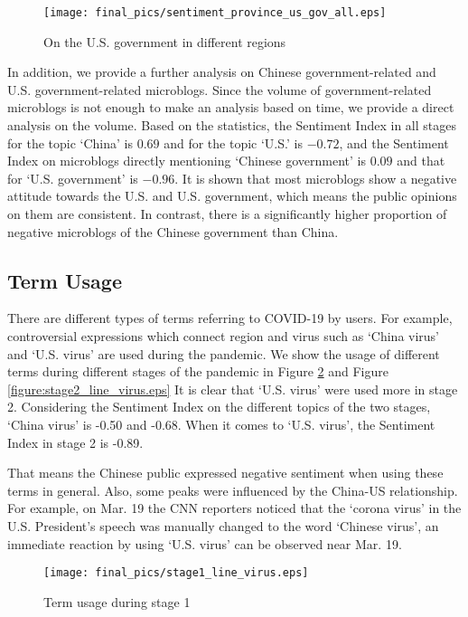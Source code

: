 \documentclass[sigconf, nonacm=true]{acmart}
\begin{document}
\begin{figure}[t]
  \texttt{[image: final\_pics/sentiment\_province\_us\_gov\_all.eps]}
  \vspace{-0.3cm}
  \caption{On the U.S. government in different regions}
  \vspace{-0.3cm}
  \label{figure:sentiment_province_us_gov_all}
\end{figure}


In addition, we provide a further analysis on Chinese government-related and U.S. government-related microblogs.
Since the volume of government-related microblogs is not enough to make an analysis based on time, we provide a direct analysis on the volume.
Based on the statistics, the Sentiment Index in all stages for the topic `China' is $0.69$ and for the topic `U.S.' is $-0.72$, and the Sentiment Index on microblogs directly mentioning `Chinese government' is $0.09$ and that for `U.S. government' is $-0.96$.
It is shown that most microblogs show a negative attitude towards the U.S. and U.S. government, which means the public opinions on them are consistent.
In contrast, there is a significantly higher proportion of negative microblogs of the  Chinese government than China.
 \vspace{-0.1cm}
\subsection{Term Usage}
There are different types of terms referring to COVID-19 by users.
For example, controversial expressions which connect region and virus such as `China virus' and `U.S. virus' are used during the pandemic.
We show the usage of different terms during different stages of the pandemic in Figure \ref{figure:stage1_line_virus.eps} and Figure \ref{figure:stage2_line_virus.eps}
It is clear that `U.S. virus' were  used more in stage 2.
Considering the Sentiment Index on the different topics of the two stages, `China virus' is -0.50 and -0.68.
When it comes to `U.S. virus', the Sentiment Index in stage 2 is -0.89.

That means the Chinese public expressed negative sentiment when using these terms in general.
Also, some peaks were influenced by the China-US relationship.
For example, on Mar. 19 the CNN reporters noticed that the `corona virus' in the U.S. President's speech was manually changed to the word `Chinese virus', an immediate reaction by using `U.S. virus' can be observed near Mar. 19.
\begin{figure}[t!]
  \texttt{[image: final\_pics/stage1\_line\_virus.eps]}
  \vspace{-0.3cm}
  \caption{Term usage during stage 1}
  \vspace{-0.3cm}
  \label{figure:stage1_line_virus.eps}
\end{figure}
\end{document}

